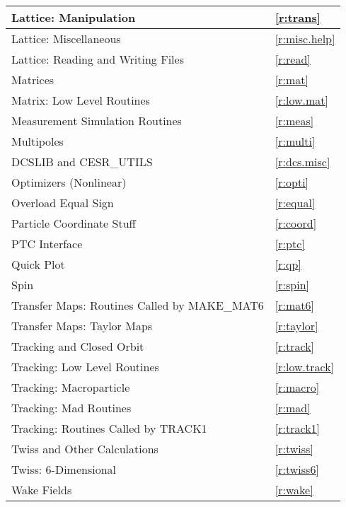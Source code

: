 \begin{center}
\begin{tabular}{|l|l|}
  Lattice: Manipulation                       & \ref{r:trans}          \\ \hline
  Lattice: Miscellaneous                      & \ref{r:misc.help}      \\ \hline
  Lattice: Reading and Writing Files          & \ref{r:read}           \\ \hline
  Matrices                                    & \ref{r:mat}            \\ \hline
  Matrix: Low Level Routines                  & \ref{r:low.mat}        \\ \hline
  Measurement Simulation Routines             & \ref{r:meas}           \\ \hline
  Multipoles                                  & \ref{r:multi}          \\ \hline
  DCSLIB and CESR_UTILS                       & \ref{r:dcs.misc}       \\ \hline
  Optimizers (Nonlinear)                      & \ref{r:opti}           \\ \hline
  Overload Equal Sign                         & \ref{r:equal}          \\ \hline
  Particle Coordinate Stuff                   & \ref{r:coord}          \\ \hline
  PTC Interface                               & \ref{r:ptc}            \\ \hline
  Quick Plot                                  & \ref{r:qp}             \\ \hline
  Spin                                        & \ref{r:spin}           \\ \hline
  Transfer Maps: Routines Called by MAKE_MAT6 & \ref{r:mat6}           \\ \hline
  Transfer Maps: Taylor Maps                  & \ref{r:taylor}         \\ \hline
  Tracking and Closed Orbit                   & \ref{r:track}          \\ \hline
  Tracking: Low Level Routines                & \ref{r:low.track}      \\ \hline
  Tracking: Macroparticle                     & \ref{r:macro}          \\ \hline
  Tracking: Mad Routines                      & \ref{r:mad}            \\ \hline
  Tracking: Routines Called by TRACK1         & \ref{r:track1}         \\ \hline
  Twiss and Other Calculations                & \ref{r:twiss}          \\ \hline
  Twiss: 6-Dimensional                        & \ref{r:twiss6}         \\ \hline
  Wake Fields                                 & \ref{r:wake}           \\ \hline
\end{tabular}
\end{center}
\toffset

